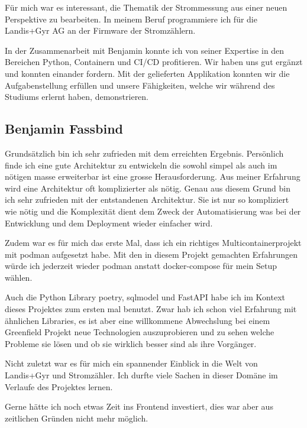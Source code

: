 Für mich war es interessant, die Thematik der Strommessung aus einer neuen Perspektive zu bearbeiten.
In meinem Beruf programmiere ich für die Landis+Gyr AG an der Firmware der Stromzählern.

In der Zusammenarbeit mit Benjamin konnte ich von seiner Expertise in den Bereichen Python, Containern und CI/CD profitieren.
Wir haben uns gut ergänzt und konnten einander fordern.
Mit der gelieferten Applikation konnten wir die Aufgabenstellung erfüllen 
und unsere Fähigkeiten, welche wir während des Studiums erlernt haben, demonstrieren.

\subsection{Benjamin Fassbind}

Grundsätzlich bin ich sehr zufrieden mit dem erreichten Ergebnis.
Persönlich finde ich eine gute Architektur zu entwickeln die sowohl simpel
als auch im nötigen masse erweiterbar ist eine grosse Herausforderung.
Aus meiner Erfahrung wird eine Architektur oft komplizierter als nötig.
Genau aus diesem Grund bin ich sehr zufrieden mit der entstandenen Architektur.
Sie ist nur so kompliziert wie nötig und die Komplexität dient dem Zweck
der Automatisierung was bei der Entwicklung und dem Deployment wieder einfacher wird.

Zudem war es für mich das erste Mal, dass ich ein richtiges Multicontainerprojekt
mit podman aufgesetzt habe. Mit den in diesem Projekt gemachten Erfahrungen
würde ich jederzeit wieder podman anstatt docker-compose für mein Setup wählen.

Auch die Python Library poetry, sqlmodel und FastAPI habe ich im Kontext dieses
Projektes zum ersten mal benutzt. Zwar hab ich schon viel Erfahrung mit
ähnlichen Libraries, es ist aber eine willkommene Abwechslung bei einem
Greenfield Projekt neue Technologien auszuprobieren und zu sehen welche Probleme sie lösen
und ob sie wirklich besser sind als ihre Vorgänger.

Nicht zuletzt war es für mich ein spannender Einblick in die Welt von Landis+Gyr
und Stromzähler. Ich durfte viele Sachen in dieser Domäne im Verlaufe des Projektes lernen.

Gerne hätte ich noch etwas Zeit ins Frontend investiert, dies war aber aus zeitlichen Gründen
nicht mehr möglich.